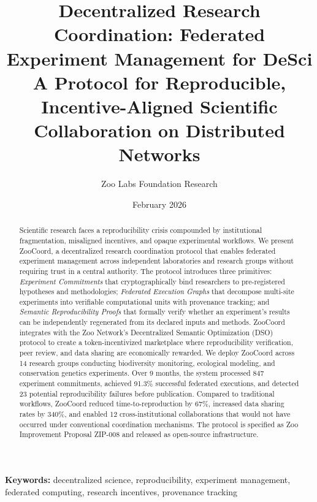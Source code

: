 \documentclass[11pt,a4paper]{article}
\title{\textbf{Decentralized Research Coordination: Federated Experiment Management for DeSci} \\[0.5em]
\large A Protocol for Reproducible, Incentive-Aligned Scientific Collaboration on Distributed Networks}
\author[1]{Zoo Labs Foundation Research}
\affil[1]{Zoo Labs Foundation, Research Division \\ \texttt{research@zoo.ngo}}
\date{February 2026}
\begin{document}
\maketitle

\begin{abstract}
\noindent
Scientific research faces a reproducibility crisis compounded by institutional fragmentation, misaligned incentives, and opaque experimental workflows.
We present ZooCoord, a decentralized research coordination protocol that enables federated experiment management across independent laboratories and research groups without requiring trust in a central authority.
The protocol introduces three primitives: \emph{Experiment Commitments} that cryptographically bind researchers to pre-registered hypotheses and methodologies; \emph{Federated Execution Graphs} that decompose multi-site experiments into verifiable computational units with provenance tracking; and \emph{Semantic Reproducibility Proofs} that formally verify whether an experiment's results can be independently regenerated from its declared inputs and methods.
ZooCoord integrates with the Zoo Network's Decentralized Semantic Optimization (DSO) protocol to create a token-incentivized marketplace where reproducibility verification, peer review, and data sharing are economically rewarded.
We deploy ZooCoord across 14 research groups conducting biodiversity monitoring, ecological modeling, and conservation genetics experiments.
Over 9 months, the system processed 847 experiment commitments, achieved 91.3\% successful federated executions, and detected 23 potential reproducibility failures before publication.
Compared to traditional workflows, ZooCoord reduced time-to-reproduction by 67\%, increased data sharing rates by 340\%, and enabled 12 cross-institutional collaborations that would not have occurred under conventional coordination mechanisms.
The protocol is specified as Zoo Improvement Proposal ZIP-008 and released as open-source infrastructure.
\end{abstract}

\vspace{0.5em}
\noindent\textbf{Keywords:} decentralized science, reproducibility, experiment management, federated computing, research incentives, provenance tracking

\end{document}
